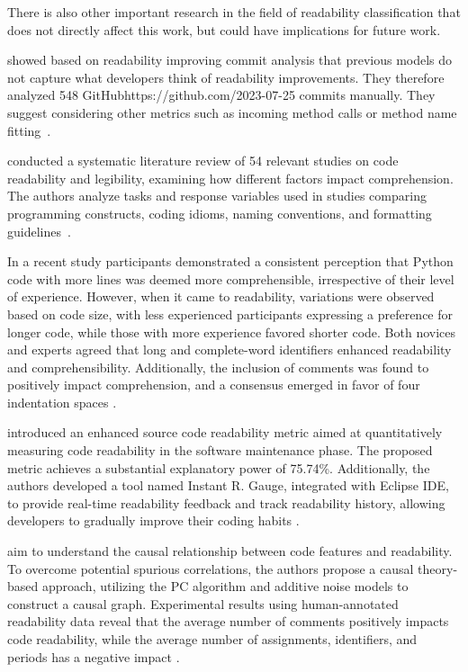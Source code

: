 \documentclass[%
class=scrreprt,
chapterprefix=false,%
open=right,%
twoside=false,%
paper=a4,%
logofile={Logo\_zentral\_farbig\_EN.png},%
thesistype=master,%
UKenglish,%
]{se2thesis}
\theoremstyle{definition}
\begin{document}
	There is also other important research in the field of readability classification that does not directly affect this work, but could have implications for future work.
	
	\citeauthor{fakhoury2019improving} showed based on readability improving commit analysis that previous models do not capture what developers think of readability improvements. They therefore analyzed 548 GitHub{https://github.com/}{2023-07-25} commits manually. They suggest considering other metrics such as incoming method calls or method name fitting~\cite{fakhoury2019improving}.	
	
	\citeauthor{oliveira2020evaluating} conducted a systematic literature review of 54 relevant studies on code readability and legibility, examining how different factors impact comprehension. The authors analyze tasks and response variables used in studies comparing programming constructs, coding idioms, naming conventions, and formatting guidelines~\cite{oliveira2020evaluating}.
	
	In a recent study participants demonstrated a consistent perception that Python code with more lines was deemed more comprehensible, irrespective of their level of experience. However, when it came to readability, variations were observed based on code size, with less experienced participants expressing a preference for longer code, while those with more experience favored shorter code. Both novices and experts agreed that long and complete-word identifiers enhanced readability and comprehensibility. Additionally, the inclusion of comments was found to positively impact comprehension, and a consensus emerged in favor of four indentation spaces \cite{ribeiro2018attributes}.
	
	\citeauthor{choi2020metric} introduced an enhanced source code readability metric aimed at quantitatively measuring code readability in the software maintenance phase. The proposed metric achieves a substantial explanatory power of 75.74\%. Additionally, the authors developed a tool named Instant R. Gauge, integrated with Eclipse IDE, to provide real-time readability feedback and track readability history, allowing developers to gradually improve their coding habits \cite{choi2020metric}.
	
	\citeauthor{mi2023makes} aim to understand the causal relationship between code features and readability. To overcome potential spurious correlations, the authors propose a causal theory-based approach, utilizing the PC algorithm and additive noise models to construct a causal graph. Experimental results using human-annotated readability data reveal that the average number of comments positively impacts code readability, while the average number of assignments, identifiers, and periods has a negative impact \cite{mi2023makes}.
	
\end{document}
